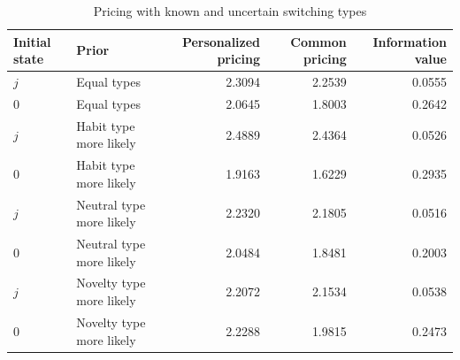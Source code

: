 \begin{table}[htbp]\centering\small
\caption{Pricing with known and uncertain switching types}
\label{tab:gamma-uncertainty}
\begin{tabular}{llrrr}\toprule
Initial state & Prior & Personalized pricing & Common pricing & Information value\\\midrule
$j$ & Equal types & 2.3094 & 2.2539 & 0.0555 \\
$0$ & Equal types & 2.0645 & 1.8003 & 0.2642 \\
$j$ & Habit type more likely & 2.4889 & 2.4364 & 0.0526 \\
$0$ & Habit type more likely & 1.9163 & 1.6229 & 0.2935 \\
$j$ & Neutral type more likely & 2.2320 & 2.1805 & 0.0516 \\
$0$ & Neutral type more likely & 2.0484 & 1.8481 & 0.2003 \\
$j$ & Novelty type more likely & 2.2072 & 2.1534 & 0.0538 \\
$0$ & Novelty type more likely & 2.2288 & 1.9815 & 0.2473 \\
\bottomrule\end{tabular}
\end{table}
